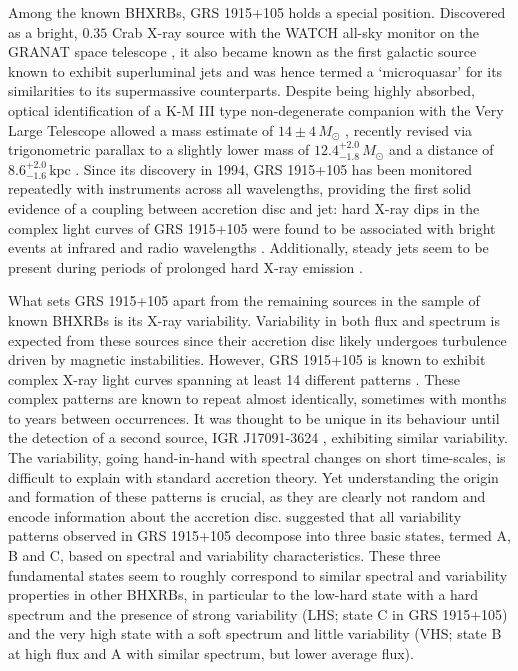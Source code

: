 \documentclass[12pt]{emulateapj}
\begin{document}
Among the known BHXRBs, GRS 1915+105 holds a special position. Discovered as a bright, $0.35$ Crab X-ray source \citep{castrotirado1994} with the WATCH all-sky monitor on the GRANAT space telescope \citep{castrotirado1992}, it also became known as the first galactic source known to exhibit superluminal jets \citep{mirabel1994, fender1999} and was hence termed a `microquasar' for its similarities to its supermassive counterparts. 
Despite being highly absorbed, optical identification of a K-M III type non-degenerate companion with the Very Large Telescope allowed a mass estimate of $14\pm 4\,M_\odot$ \citep{greiner2001}, recently revised via trigonometric parallax to a slightly lower mass of $12.4^{+2.0}_{-1.8}\, M_\odot$ and a distance of $8.6^{+2.0}_{-1.6}\,\mathrm{kpc}$ \citep{reid2014}. 
Since its discovery in 1994, GRS 1915+105 has been monitored repeatedly with instruments across all wavelengths, providing the first solid evidence of a coupling between accretion disc and jet: hard X-ray dips in the complex light curves of GRS 1915+105 were found to be associated with bright events at infrared and radio wavelengths \citep{pooley1997, eikenberry1998a, eikenberry1998b, kleinwolt2002}. Additionally, steady jets seem to be present during periods of prolonged hard X-ray emission \citep{foster1996, dhawan2000, fuchs2003}. 

What sets GRS 1915+105 apart from the remaining sources in the sample of known BHXRBs is its X-ray variability. Variability in both flux and spectrum is expected from these sources since their accretion disc likely undergoes turbulence driven by magnetic instabilities. However, GRS 1915+105 is known to exhibit complex X-ray light curves spanning at least 14 different patterns \citep{belloni2000, kleinwolt2002, hannikainen2003, hannikainen2005}. These complex patterns are known to repeat almost identically, sometimes with months to years between occurrences. It was thought to be unique in its behaviour until the detection of a second source, IGR J17091-3624 \citep{altamirano2011}, exhibiting similar variability. 
The variability, going hand-in-hand with spectral changes on short time-scales, is difficult to explain with standard accretion theory. Yet understanding the origin and formation of these patterns is crucial, as they are clearly not random and encode information about the accretion disc. \citet{belloni1997a, belloni1997b, belloni2000} suggested that all variability patterns observed in GRS 1915+105 decompose into three basic states, termed A, B and C, based on spectral and variability characteristics. These three fundamental states seem to roughly correspond to similar spectral and variability properties in other BHXRBs, in particular to the low-hard state with a hard spectrum and the presence of strong variability (LHS; state C in GRS 1915+105) and the very high state with a soft spectrum and little variability (VHS; state B at high flux and A with similar spectrum, but lower average flux).
\end{document}
